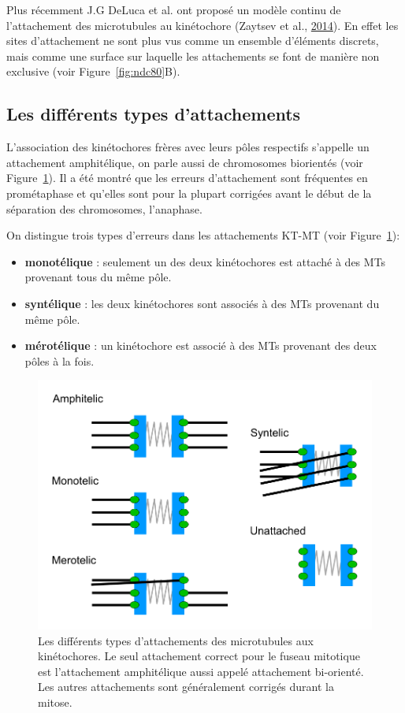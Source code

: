 \documentclass[12pt,a4paper,twoside,openright]{book}
\begin{document}
Plus récemment J.G DeLuca et al. ont proposé un modèle continu de
l'attachement des microtubules au kinétochore (Zaytsev et al.,
\hyperref[ref-Zaytsev2014]{2014}). En effet les sites d'attachement ne
sont plus vus comme un ensemble d'éléments discrets, mais comme une
surface sur laquelle les attachements se font de manière non exclusive
(voir Figure~\ref{fig:ndc80}B).

\subsection{Les différents types
d'attachements}\label{sec:attachments-type}

L'association des kinétochores frères avec leurs pôles respectifs
s'appelle un attachement amphitélique, on parle aussi de chromosomes
biorientés (voir Figure~\ref{fig:attachements}). Il a été montré que les
erreurs d'attachement sont fréquentes en prométaphase et qu'elles sont
pour la plupart corrigées avant le début de la séparation des
chromosomes, l'anaphase.

On distingue trois types d'erreurs dans les attachements KT-MT (voir
Figure~\ref{fig:attachements}):

\begin{itemize}
\item
  \textbf{monotélique} : seulement un des deux kinétochores est attaché
  à des MTs provenant tous du même pôle.
\item
  \textbf{syntélique} : les deux kinétochores sont associés à des MTs
  provenant du même pôle.
\item
  \textbf{mérotélique} : un kinétochore est associé à des MTs provenant
  des deux pôles à la fois.
\end{itemize}

\begin{figure}[htbp]
\centering
\includegraphics{figures/intro/attachments.png}
\caption[Les différents types d'attachements des microtubules aux kinétochores]{\label{fig:attachements}Les
différents types d'attachements des microtubules aux kinétochores. Le
seul attachement correct pour le fuseau mitotique est l'attachement
amphitélique aussi appelé attachement bi-orienté. Les autres
attachements sont généralement corrigés durant la mitose.}
\end{figure}
\end{document}
